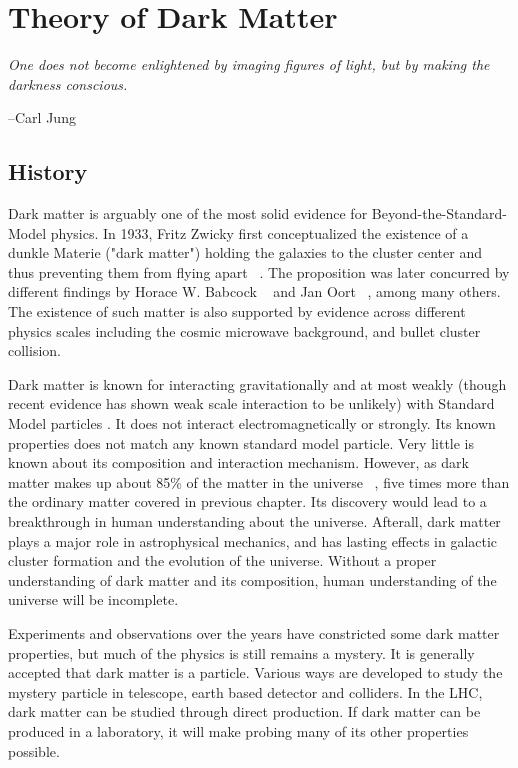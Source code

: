 \chapter{Theory of Dark Matter}
\label{chapter:DM}


\epigraph{\textit{One does not become enlightened by imaging figures of light, but by making the darkness conscious.}}{--Carl Jung}


	


\section{History}
\label{section:history}
    Dark matter is arguably one of the most solid evidence for Beyond-the-Standard-Model physics. In 1933, Fritz Zwicky first conceptualized the existence of a dunkle Materie ("dark matter") holding the galaxies to the cluster center and thus preventing them from flying apart ~\cite{Zwicky}. The proposition was later concurred by different findings by Horace W. Babcock ~\cite{Babcock} and Jan Oort ~\cite{oort}, among many others. The existence of such matter is also supported by evidence across different physics scales including the cosmic microwave background, and bullet cluster collision.

    Dark matter is known for interacting gravitationally and at most weakly (though recent evidence has shown weak scale interaction to be unlikely) with Standard Model particles . It does not interact electromagnetically or strongly. Its known properties does not match any known standard model particle. Very little is known about its composition and interaction mechanism. However, as dark matter makes up about 85\% of the matter in the universe ~\cite{Hinshaw_2013}, five times more than the ordinary matter covered in previous chapter. Its discovery would lead to a breakthrough in human understanding about the universe. Afterall, dark matter plays a major role in astrophysical mechanics, and has lasting effects in galactic cluster formation and the evolution of the universe. Without a proper understanding of dark matter and its composition, human understanding of the universe will be incomplete.

    Experiments and observations over the years have constricted some dark matter properties, but much of the physics is still remains a mystery. It is generally accepted that dark matter is a particle. Various ways are developed to study the mystery particle in telescope, earth based detector and colliders. In the LHC, dark matter can be studied through direct production. If dark matter can be produced in a laboratory, it will make probing many of its other properties possible. 

